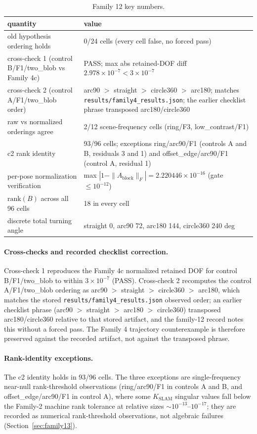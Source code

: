 \documentclass[12pt]{article}
\begin{document}
\begin{table}[htbp]
\centering
\small
\caption{Family 12 key numbers.}
\label{tab:f12}
\begin{tabular}{p{} p{}}
\toprule
quantity & value \\
\midrule
old hypothesis ordering holds & 0/24 cells (every cell false, no forced pass) \\
cross-check 1 (control B/F1/two\_blob vs Family 4c) &
PASS; max abs retained-DOF diff $2.978\times10^{-7}<3\times10^{-7}$ \\
cross-check 2 (control A/F1/two\_blob order) &
arc90 $>$ straight $>$ circle360 $>$ arc180; matches
\texttt{results/family4\_results.json}; the earlier checklist phrase
transposed arc180/circle360 \\
raw vs normalized orderings agree & 2/12 scene-frequency cells
(ring/F3, low\_contrast/F1) \\
c2 rank identity & 93/96 cells; exceptions ring/arc90/F1 (controls A and B,
residuals 3 and 1) and offset\_edge/arc90/F1 (control A, residual 1) \\
per-pose normalization verification & max $|1-\|A_{\mathrm{block}}\|_F|=
2.220446\times10^{-16}$ (gate $\le10^{-12}$) \\
$\mathrm{rank}(B)$ across all 96 cells & 18 in every cell \\
discrete total turning angle & straight 0, arc90 72, arc180 144,
circle360 240 deg \\
\bottomrule
\end{tabular}
\end{table}

\paragraph{Cross-checks and recorded checklist correction.}
Cross-check 1 reproduces the Family 4c normalized retained DOF for
control B/F1/two\_blob to within $3\times10^{-7}$ (PASS). Cross-check 2
recomputes the control A/F1/two\_blob ordering as
arc90 $>$ straight $>$ circle360 $>$ arc180, which matches the stored
\texttt{results/family4\_results.json} observed order; an earlier checklist
phrase (arc90 $>$ straight $>$ arc180 $>$ circle360) transposed
arc180/circle360 relative to that stored artifact, and the family-12 record
notes this without a forced pass. The Family 4 trajectory counterexample is
therefore preserved against the recorded artifact, not against the transposed
phrase.

\paragraph{Rank-identity exceptions.}
The c2 identity holds in 93/96 cells. The three exceptions are
single-frequency near-null rank-threshold observations (ring/arc90/F1 in
controls A and B, and offset\_edge/arc90/F1 in control A), where some
$K_{\mathrm{SLAM}}$ singular values fall below the Family-2 machine rank
tolerance at relative sizes $\sim10^{-13}$--$10^{-17}$; they are recorded as
numerical rank-threshold observations, not algebraic failures
(Section~\ref{sec:family13}).
\end{document}
